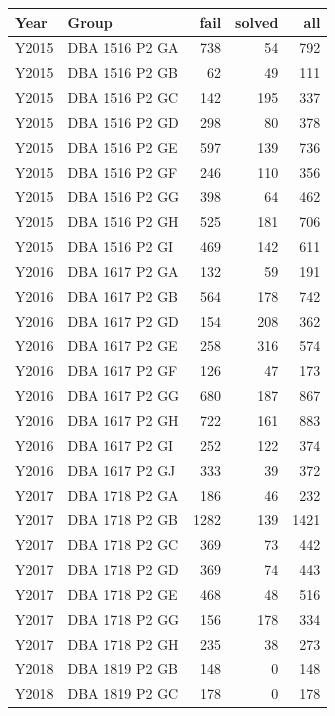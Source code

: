 \begin{longtable}{llrrr}
\hline
\textbf{Year} & \textbf{Group} &  \textbf{fail} &  \textbf{solved} &  \textbf{all} \\
\hline
Y2015 & DBA 1516 P2 GA &   738 &      54 &  792 \\
Y2015 & DBA 1516 P2 GB &    62 &      49 &  111 \\
Y2015 & DBA 1516 P2 GC &   142 &     195 &  337 \\
Y2015 & DBA 1516 P2 GD &   298 &      80 &  378 \\
Y2015 & DBA 1516 P2 GE &   597 &     139 &  736 \\
Y2015 & DBA 1516 P2 GF &   246 &     110 &  356 \\
Y2015 & DBA 1516 P2 GG &   398 &      64 &  462 \\
Y2015 & DBA 1516 P2 GH &   525 &     181 &  706 \\
Y2015 & DBA 1516 P2 GI &   469 &     142 &  611 \\
Y2016 & DBA 1617 P2 GA &   132 &      59 &  191 \\
Y2016 & DBA 1617 P2 GB &   564 &     178 &  742 \\
Y2016 & DBA 1617 P2 GD &   154 &     208 &  362 \\
Y2016 & DBA 1617 P2 GE &   258 &     316 &  574 \\
Y2016 & DBA 1617 P2 GF &   126 &      47 &  173 \\
Y2016 & DBA 1617 P2 GG &   680 &     187 &  867 \\
Y2016 & DBA 1617 P2 GH &   722 &     161 &  883 \\
Y2016 & DBA 1617 P2 GI &   252 &     122 &  374 \\
Y2016 & DBA 1617 P2 GJ &   333 &      39 &  372 \\
Y2017 & DBA 1718 P2 GA &   186 &      46 &  232 \\
Y2017 & DBA 1718 P2 GB &  1282 &     139 & 1421 \\
Y2017 & DBA 1718 P2 GC &   369 &      73 &  442 \\
Y2017 & DBA 1718 P2 GD &   369 &      74 &  443 \\
Y2017 & DBA 1718 P2 GE &   468 &      48 &  516 \\
Y2017 & DBA 1718 P2 GG &   156 &     178 &  334 \\
Y2017 & DBA 1718 P2 GH &   235 &      38 &  273 \\
Y2018 & DBA 1819 P2 GB &   148 &       0 &  148 \\
Y2018 & DBA 1819 P2 GC &   178 &       0 &  178 \\

\end{longtable}
